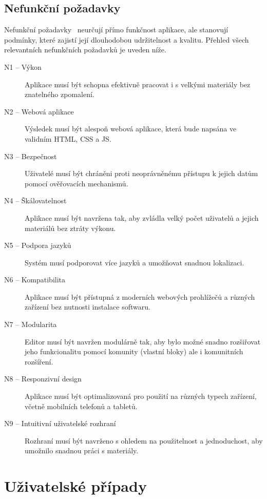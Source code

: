 \subsection{Nefunkční požadavky}
Nefunkční požadavky~\cite{uml_2007} neurčují přímo funkčnost aplikace, ale stanovují podmínky, které zajistí její dlouhodobou udržitelnost a kvalitu. Přehled všech relevantních nefunkčních požadavků je uveden níže.


\begin{description}
    \item[N1 -- Výkon]
    Aplikace musí být schopna efektivně pracovat i s velkými materiály bez znatelného zpomalení.
    
    \item[N2 -- Webová aplikace]
    Výsledek musí být alespoň webová aplikace, která bude napsána ve validním HTML, CSS a JS.
    
    \item[N3 -- Bezpečnost]
    Uživatelé musí být chráněni proti neoprávněnému přístupu k jejich datům pomocí ověřovacích mechanismů.
    
    \item[N4 -- Škálovatelnost]
    Aplikace musí být navržena tak, aby zvládla velký počet uživatelů a jejich materiálů bez ztráty výkonu.
    
    \item[N5 -- Podpora jazyků]
    Systém musí podporovat více jazyků a umožňovat snadnou lokalizaci.
    
    \item[N6 -- Kompatibilita]
    Aplikace musí být přístupná z moderních webových prohlížečů a různých zařízení bez nutnosti instalace softwaru.
    
    \item[N7 -- Modularita]
    Editor musí být navržen modulárně tak, aby bylo možné snadno rozšiřovat jeho funkcionalitu pomocí komunity (vlastní bloky) ale i komunitních rozšíření.
    
    \item[N8 -- Responzivní design]
    Aplikace musí být optimalizovaná pro použití na různých typech zařízení, včetně mobilních telefonů a tabletů.
    
    \item[N9 -- Intuitivní uživatelské rozhraní]
    Rozhraní musí být navrženo s ohledem na použitelnost a jednoduchost, aby umožnilo snadnou práci s materiály.
\end{description}
\section{Uživatelské případy}\label{chapter:analyza/uzivatelskePripady}

